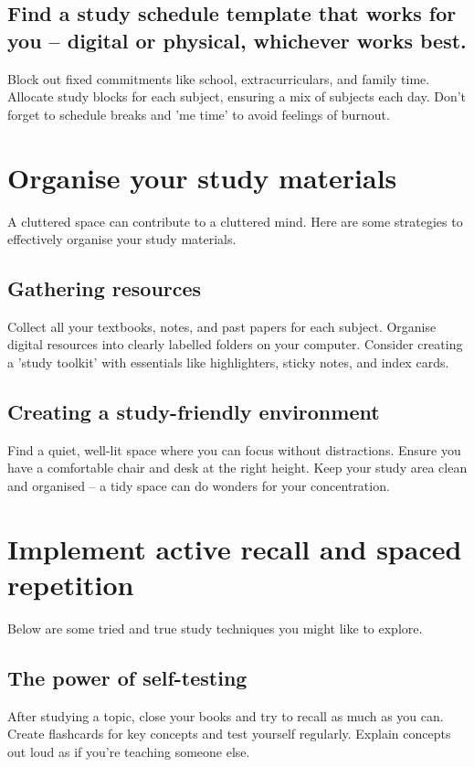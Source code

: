 \documentclass[a4paper]{article}
\begin{document}
\subsection{Find a study schedule template that works for you – digital or physical, whichever works best.}
Block out fixed commitments like school, extracurriculars, and family time.
Allocate study blocks for each subject, ensuring a mix of subjects each day.
Don't forget to schedule breaks and 'me time' to avoid feelings of burnout.\\

\section{Organise your study materials}
A cluttered space can contribute to a cluttered mind. Here are some strategies to effectively organise your study materials.

\subsection{Gathering resources}
Collect all your textbooks, notes, and past papers for each subject.
Organise digital resources into clearly labelled folders on your computer.
Consider creating a 'study toolkit' with essentials like highlighters, sticky notes, and index cards.
\subsection{Creating a study-friendly environment}
Find a quiet, well-lit space where you can focus without distractions.
Ensure you have a comfortable chair and desk at the right height.
Keep your study area clean and organised – a tidy space can do wonders for your concentration.\\


\section{Implement active recall and spaced repetition}
Below are some tried and true study techniques you might like to explore.

\subsection{The power of self-testing}
After studying a topic, close your books and try to recall as much as you can.
Create flashcards for key concepts and test yourself regularly.
Explain concepts out loud as if you're teaching someone else.
\end{document}
